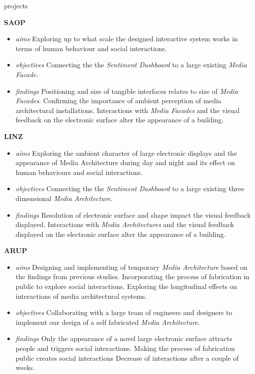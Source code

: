 \begin{singlespace}
{\begin{labeling}{projects}
\item [\textbf{SAOP}]
\begin {itemize}
\footnotesize
\item [\textit{aims}] Exploring up to what scale the designed interactive system works in terms of human behaviour and social interactions.
\item [\textit{objectives}] Connecting the the \textit{Sentiment Dashboard} to a large existing \textit{Media Facade}. 
\item [\textit{findings}] Positioning and size of tangible interfaces relates to size of \textit{Media Facades}. \newline Confirming the importance of ambient perception of media architectural installations. \newline Interactions with \textit{Media Facades} and the visual feedback on the electronic surface alter the appearance of a building.
\end{itemize}
 
\item [\textbf{LINZ}] 
\begin {itemize}
\footnotesize
\item [\textit{aims}] Exploring the ambient character of large electronic displays and the appearance of Media Architecture during day and night and its effect on human behaviours and social interactions.  
\item [\textit{objectives}]Connecting the the \textit{Sentiment Dashboard} to a large existing three dimensional \textit{Media Architecture}.
\item [\textit{findings}] Resolution of electronic surface and shape impact the visual feedback displayed. \newline Interactions with \textit{Media Architectures} and the visual feedback displayed on the electronic surface alter the appearance of a building.
\end{itemize}

\item [\textbf{ARUP}]
\begin {itemize}
\footnotesize
\item [\textit{aims}] Designing and implementing of temporary \textit{Media Architecture} based on the findings from previous studies.  \newline Incorporating the process of fabrication in public to explore social interactions. \newline Exploring the longitudinal effects on interactions of media architectural systems.
\item [\textit{objectives}] Collaborating with a large team of engineers and designers to implement our design of a self fabricated \textit{Media Architecture}.
\item [\textit{findings}] Only the appearance of a novel large electronic surface attracts people and triggers social interactions. \newline Making the process of fabrication public creates social interactions \newline Decrease of interactions after a couple of weeks.
\end{itemize}


\end{labeling}}
\end{singlespace}
